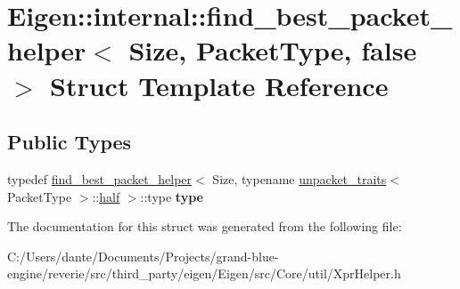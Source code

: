 \hypertarget{struct_eigen_1_1internal_1_1find__best__packet__helper_3_01_size_00_01_packet_type_00_01false_01_4}{}\section{Eigen\+::internal\+::find\+\_\+best\+\_\+packet\+\_\+helper$<$ Size, Packet\+Type, false $>$ Struct Template Reference}
\label{struct_eigen_1_1internal_1_1find__best__packet__helper_3_01_size_00_01_packet_type_00_01false_01_4}
\subsection*{Public Types}
\begin{DoxyCompactItemize}
\item 
\mbox{\label{struct_eigen_1_1internal_1_1find__best__packet__helper_3_01_size_00_01_packet_type_00_01false_01_4_a60cab6855e901dac36aef09163bb8739}} 
typedef \mbox{\hyperlink{struct_eigen_1_1internal_1_1find__best__packet__helper}{find\+\_\+best\+\_\+packet\+\_\+helper}}$<$ Size, typename \mbox{\hyperlink{struct_eigen_1_1internal_1_1unpacket__traits}{unpacket\+\_\+traits}}$<$ Packet\+Type $>$\+::\mbox{\hyperlink{struct_eigen_1_1half}{half}} $>$\+::type {\bfseries type}
\end{DoxyCompactItemize}


The documentation for this struct was generated from the following file\+:\begin{DoxyCompactItemize}
\item 
C\+:/\+Users/dante/\+Documents/\+Projects/grand-\/blue-\/engine/reverie/src/third\+\_\+party/eigen/\+Eigen/src/\+Core/util/Xpr\+Helper.\+h\end{DoxyCompactItemize}
